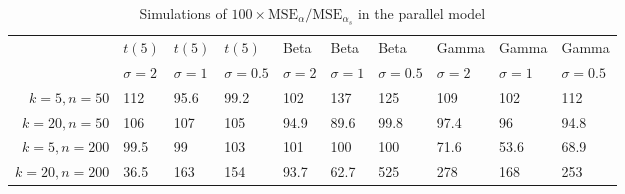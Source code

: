 \begin{table}[ht]
\centering
\caption{Simulations of $100 \times \textrm{MSE}_\alpha/\textrm{MSE}_{\alpha_s}$ in the parallel model} 
\label{tab:simulation}
\begin{tabular}{rlllllllll}
    & $t(5)$ & $t(5)$ & $t(5)$ & Beta & Beta & Beta & Gamma & Gamma & Gamma \\
  & $\sigma = 2$ & $\sigma = 1$ & $\sigma = 0.5$ & $\sigma = 2$ & $\sigma = 1$ & $\sigma = 0.5$ & $\sigma = 2$ & $\sigma = 1$ & $\sigma = 0.5$ \\
$k = 5, n = 50$ & 112 & 95.6 & 99.2 & 102 & 137 & 125 & 109 & 102 & 112 \\ 
  $k = 20, n = 50$ & 106 & 107 & 105 & 94.9 & 89.6 & 99.8 & 97.4 & 96 & 94.8 \\ 
  $k = 5, n = 200$ & 99.5 & 99 & 103 & 101 & 100 & 100 & 71.6 & 53.6 & 68.9 \\ 
  $k = 20, n = 200$ & 36.5 & 163 & 154 & 93.7 & 62.7 & 525 & 278 & 168 & 253 \\ 
  \end{tabular}
\end{table}
\newcommand{\geomean}{1.09}

